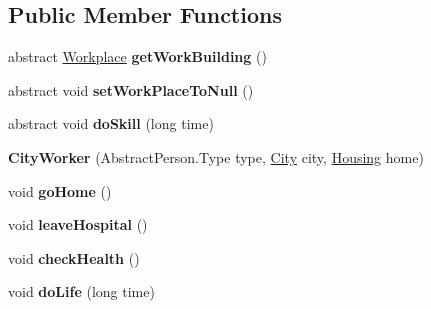 \subsection*{Public Member Functions}
\begin{DoxyCompactItemize}
\item 
abstract \hyperlink{classbuildings_1_1workplaces_1_1_workplace}{Workplace} {\bfseries get\+Work\+Building} ()\hypertarget{classpeople_1_1cityworkers_1_1_city_worker_a96ee9d8940c6b8f365c9faca507a8e80}{}\label{classpeople_1_1cityworkers_1_1_city_worker_a96ee9d8940c6b8f365c9faca507a8e80}

\item 
abstract void {\bfseries set\+Work\+Place\+To\+Null} ()\hypertarget{classpeople_1_1cityworkers_1_1_city_worker_a0a2eea8781869f25932b6714162f43c7}{}\label{classpeople_1_1cityworkers_1_1_city_worker_a0a2eea8781869f25932b6714162f43c7}

\item 
abstract void {\bfseries do\+Skill} (long time)\hypertarget{classpeople_1_1cityworkers_1_1_city_worker_a4d41f332618eafd43a320f438dcc3dd9}{}\label{classpeople_1_1cityworkers_1_1_city_worker_a4d41f332618eafd43a320f438dcc3dd9}

\item 
{\bfseries City\+Worker} (Abstract\+Person.\+Type type, \hyperlink{classcities_1_1_city}{City} city, \hyperlink{classbuildings_1_1housing_1_1_housing}{Housing} home)\hypertarget{classpeople_1_1cityworkers_1_1_city_worker_a87a8fbc1bf15ea3738c16e1e11f20d1f}{}\label{classpeople_1_1cityworkers_1_1_city_worker_a87a8fbc1bf15ea3738c16e1e11f20d1f}

\item 
void {\bfseries go\+Home} ()\hypertarget{classpeople_1_1cityworkers_1_1_city_worker_af635a05b4c3db1cf911d1105ec01e5ff}{}\label{classpeople_1_1cityworkers_1_1_city_worker_af635a05b4c3db1cf911d1105ec01e5ff}

\item 
void {\bfseries leave\+Hospital} ()\hypertarget{classpeople_1_1cityworkers_1_1_city_worker_a61d1f104cc06f6dc9bac5de0cfa24071}{}\label{classpeople_1_1cityworkers_1_1_city_worker_a61d1f104cc06f6dc9bac5de0cfa24071}

\item 
void {\bfseries check\+Health} ()\hypertarget{classpeople_1_1cityworkers_1_1_city_worker_af4f0a1d4fe42e1f210fc05d222be9bba}{}\label{classpeople_1_1cityworkers_1_1_city_worker_af4f0a1d4fe42e1f210fc05d222be9bba}

\item 
void {\bfseries do\+Life} (long time)\hypertarget{classpeople_1_1cityworkers_1_1_city_worker_ab2ef8cb5e3f7242302f64c9be1efb05d}{}\label{classpeople_1_1cityworkers_1_1_city_worker_ab2ef8cb5e3f7242302f64c9be1efb05d}


\end{DoxyCompactItemize}

